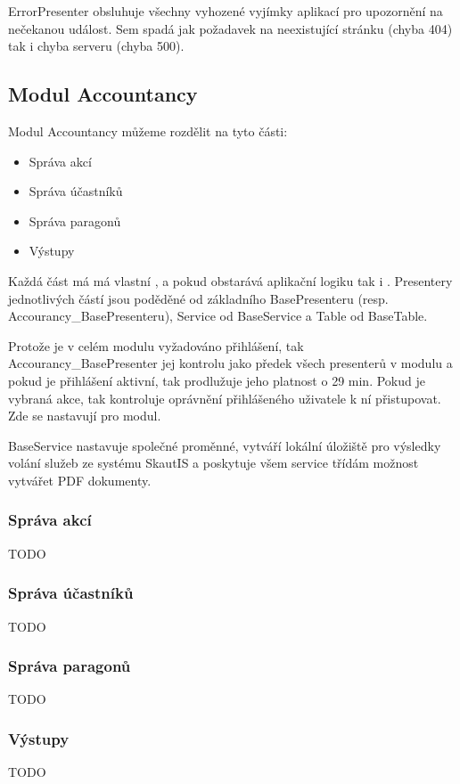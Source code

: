 \documentclass[thesis=B,czech]{FITthesis}[2011/06/14]
\begin{document}
ErrorPresenter obsluhuje všechny vyhozené vyjímky aplikací pro upozornění na nečekanou událost. Sem spadá jak požadavek na neexistující stránku (chyba 404) tak i chyba serveru (chyba 500).

\subsection{Modul Accountancy}

Modul Accountancy můžeme rozdělit na tyto části:
\begin{itemize}
	\item Správa akcí
	\item Správa účastníků
	\item Správa paragonů
	\item Výstupy
\end{itemize}

Každá část má má vlastní ,  a pokud obstarává aplikační logiku tak i . Presentery jednotlivých částí jsou poděděné od základního BasePresenteru (resp. Accourancy\_BasePresenteru), Service od BaseService a Table od BaseTable.

Protože je v celém modulu vyžadováno přihlášení, tak Accourancy\_BasePresenter jej kontrolu jako předek všech presenterů v modulu a pokud je přihlášení aktivní, tak prodlužuje jeho platnost o 29 min. Pokud je vybraná akce, tak kontroluje oprávnění přihlášeného uživatele k ní přistupovat. Zde se nastavují  pro modul.

BaseService nastavuje společné proměnné, vytváří lokální úložiště pro výsledky volání služeb ze systému SkautIS a poskytuje všem service třídám možnost vytvářet PDF dokumenty.

\subsubsection{Správa akcí}
TODO

\subsubsection{Správa účastníků}
TODO

\subsubsection{Správa paragonů}
TODO

\subsubsection{Výstupy}
TODO
\end{document}
